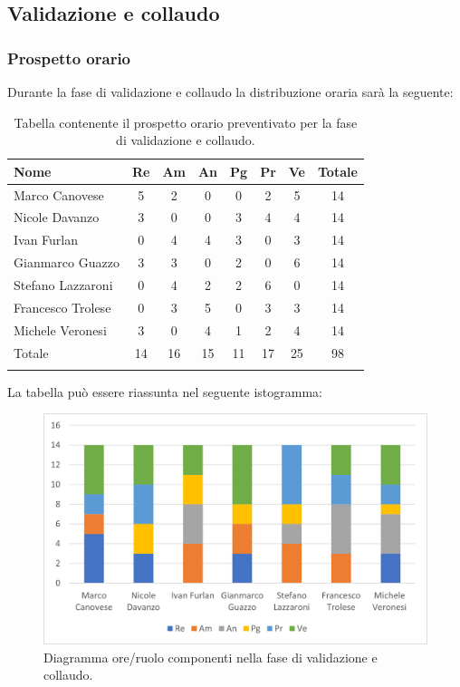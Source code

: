 			\subsection{Validazione e collaudo}
            \subsubsection{Prospetto orario}
			Durante la fase di validazione e collaudo la distribuzione oraria sarà la seguente:
			
			\begin{longtable}{|l|c|c|c|c|c|c|c|}
				\hline
				\rowcolor{lighter-grayer}
				\textbf{Nome} & \textbf{Re} & \textbf{Am} & \textbf{An} & \textbf{Pg}  & \textbf{Pr}   & \textbf{Ve} & \textbf{Totale} \\
				\hline
				\endfirsthead
				
				\hline
				Marco Canovese & 5 & 2 & 0 & 0 & 2 & 5 & 14\\
				\hline
				\hline
				Nicole Davanzo & 3 & 0 & 0 & 3 & 4 & 4 & 14\\
				\hline
				\hline
				Ivan Furlan & 0 & 4 & 4 & 3 & 0 & 3 & 14\\
				\hline
				\hline
				Gianmarco Guazzo & 3 & 3 & 0 & 2 & 0 & 6 & 14\\
				\hline
				\hline
				Stefano Lazzaroni & 0 & 4 & 2 & 2 & 6 & 0 & 14\\
				\hline
				\hline
				Francesco Trolese & 0 & 3 & 5 & 0 & 3 & 3 & 14\\
				\hline
				\hline
				Michele Veronesi & 3 & 0 & 4 & 1 & 2 & 4 & 14\\
				\hline 
				\hline
				Totale & 14 & 16 & 15 & 11 & 17 & 25 & 98\\
				\hline 
				\rowcolor{white}
				\caption{Tabella contenente il prospetto orario preventivato per la fase di validazione e collaudo.}
			\end{longtable}

		
			La tabella può essere riassunta nel seguente istogramma:
		
			\begin{figure}[H]
				\centering
				\includegraphics[width=0.8\linewidth]{res/images/preventivo/7-1.png}
				\caption{Diagramma ore/ruolo componenti nella fase di validazione e collaudo.}
				\label{fig:diagramma suddivisione ruoli fase validazione e collaudo.}
			\end{figure}
		
